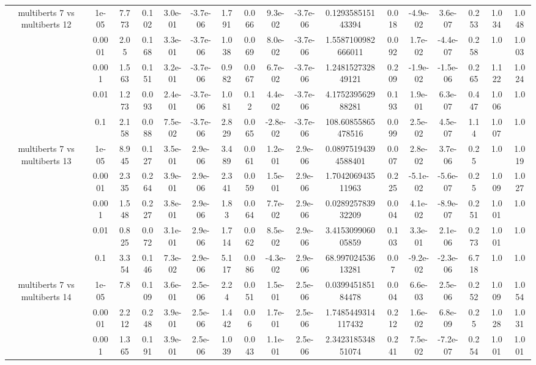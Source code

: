 \begin{tabular}{|c|c|c|c|c|c|c|c|c|c|c|c|c|c|c|c|c|}
\hline
\multirow{5}{*}{multiberts 7 vs multiberts 12} & 1e-05 & 7.773 & 0.102 & 3.0e-01 & -3.7e-06 & 1.791 & 0.066 & 9.3e-02 & -3.7e-06 & 0.129358515143394 & 0.018 & -4.9e-02 & 3.6e-07 & 0.253 & 1.034 & 1.048 \\
 & 0.0001 & 2.05 & 0.168 & 3.3e-01 & -3.7e-06 & 1.038 & 0.069 & 8.0e-02 & -3.7e-06 & 1.5587100982666011 & 0.092 & 1.7e-02 & -4.4e-07 & 0.258 & 1.0 & 1.003 \\
 & 0.001 & 1.563 & 0.151 & 3.2e-01 & -3.7e-06 & 0.982 & 0.067 & 6.7e-02 & -3.7e-06 & 1.248152732849121 & 0.209 & -1.9e-02 & -1.5e-06 & 0.265 & 1.122 & 1.024 \\
 & 0.01 & 1.273 & 0.093 & 2.4e-01 & -3.7e-06 & 1.081 & 0.12 & 4.4e-02 & -3.7e-06 & 4.175239562988281 & 0.193 & 1.9e-01 & 6.3e-07 & 0.447 & 1.006 & 1.0 \\
 & 0.1 & 2.158 & 0.088 & 7.5e-02 & -3.7e-06 & 2.829 & 0.065 & -2.8e-02 & -3.7e-06 & 108.60855865478516 & 0.099 & 2.5e-02 & 4.5e-07 & 1.14 & 1.007 & 1.0 \\
\hline
\multirow{5}{*}{multiberts 7 vs multiberts 13} & 1e-05 & 8.945 & 0.127 & 3.5e-01 & 2.9e-06 & 3.489 & 0.061 & 1.2e-01 & 2.9e-06 & 0.08975194394588401 & 0.007 & 2.8e-02 & 3.7e-06 & 0.25 & 1.0 & 1.019 \\
 & 0.0001 & 2.335 & 0.264 & 3.9e-01 & 2.9e-06 & 2.341 & 0.059 & 1.5e-01 & 2.9e-06 & 1.704206943511963 & 0.225 & -5.1e-02 & -5.6e-07 & 0.25 & 1.009 & 1.027 \\
 & 0.001 & 1.548 & 0.227 & 3.8e-01 & 2.9e-06 & 1.83 & 0.064 & 7.7e-02 & 2.9e-06 & 0.028925783932209 & 0.004 & 4.1e-02 & -8.9e-07 & 0.251 & 1.001 & 1.0 \\
 & 0.01 & 0.825 & 0.072 & 3.1e-01 & 2.9e-06 & 1.714 & 0.062 & 8.5e-02 & 2.9e-06 & 3.415309906005859 & 0.103 & 3.3e-01 & 2.1e-06 & 0.273 & 1.001 & 1.0 \\
 & 0.1 & 3.354 & 0.146 & 7.3e-02 & 2.9e-06 & 5.117 & 0.086 & -4.3e-02 & 2.9e-06 & 68.99702453613281 & 0.07 & -9.2e-02 & -2.3e-06 & 6.718 & 1.0 & 1.0 \\
\hline
\multirow{5}{*}{multiberts 7 vs multiberts 14} & 1e-05 & 7.8 & 0.109 & 3.6e-01 & 2.5e-06 & 2.24 & 0.051 & 1.5e-01 & 2.5e-06 & 0.039945185184478 & 0.004 & 6.6e-03 & 2.5e-06 & 0.252 & 1.009 & 1.054 \\
 & 0.0001 & 2.212 & 0.248 & 3.9e-01 & 2.5e-06 & 1.442 & 0.06 & 1.7e-01 & 2.5e-06 & 1.7485449314117432 & 0.212 & 1.6e-02 & 6.8e-09 & 0.25 & 1.028 & 1.031 \\
 & 0.001 & 1.365 & 0.191 & 3.9e-01 & 2.5e-06 & 1.039 & 0.043 & 1.1e-01 & 2.5e-06 & 2.342318534851074 & 0.241 & 7.5e-02 & -7.2e-07 & 0.254 & 1.001 & 1.001 \\

\end{tabular}
